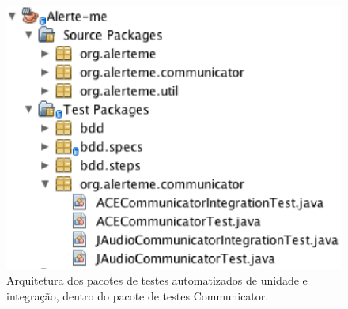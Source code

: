 \begin{figure}[H]
	\centering
	\captionsetup{justification=centering,margin=2cm}
	\includegraphics[scale=0.80]{capitulos/validacao/figuras/testesUnitEdIntegra.eps}
	\caption{Arquitetura dos pacotes de testes automatizados de unidade e integração, dentro do pacote de testes Communicator.}
	\label{fig:result-engajamento}
\end{figure}


